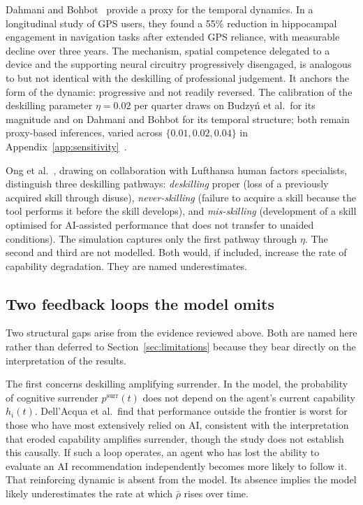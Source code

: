 \documentclass[11pt,a4paper]{article}
\begin{document}
Dahmani and Bohbot~\cite{dahmani_scirep_2020} provide a proxy for the
temporal dynamics. In a longitudinal study of GPS users, they found a 55\%
reduction in hippocampal engagement in navigation tasks after extended GPS
reliance, with measurable decline over three years. The mechanism, spatial
competence delegated to a device and the supporting neural circuitry
progressively disengaged, is analogous to but not identical with the
deskilling of professional judgement. It anchors the form of the dynamic:
progressive and not readily reversed. The calibration of the deskilling
parameter $\eta = 0.02$ per quarter draws on Budzy\'{n} et al.\ for its
magnitude and on Dahmani and Bohbot for its temporal structure; both remain
proxy-based inferences, varied across $\{0.01, 0.02, 0.04\}$ in
Appendix~\ref{app:sensitivity}~\cite{gerlich_societies_2025}.

Ong et al.~\cite{ong_npjdm_2026,casner_humafact_2014}, drawing on collaboration with Lufthansa
human factors specialists, distinguish three deskilling pathways:
\textit{deskilling} proper (loss of a previously acquired skill through
disuse), \textit{never-skilling} (failure to acquire a skill because the
tool performs it before the skill develops), and \textit{mis-skilling}
(development of a skill optimised for AI-assisted performance that does not
transfer to unaided conditions). The simulation captures only the first
pathway through $\eta$. The second and third are not modelled. Both would, if
included, increase the rate of capability degradation. They are named
underestimates.

\subsection{Two feedback loops the model omits}

Two structural gaps arise from the evidence reviewed above. Both are named
here rather than deferred to Section~\ref{sec:limitations} because they bear
directly on the interpretation of the results.

The first concerns deskilling amplifying surrender. In the model, the
probability of cognitive surrender $p^{\text{surr}}(t)$ does not depend on
the agent's current capability $h_i(t)$. Dell'Acqua et al.\ find that
performance outside the frontier is worst for those who have most
extensively relied on AI, consistent with the interpretation that eroded
capability amplifies surrender, though the study does not establish this
causally. If such a loop operates, an agent who has lost the ability to
evaluate an AI recommendation independently becomes more likely to follow
it. That reinforcing dynamic is absent from the model. Its absence implies
the model likely underestimates the rate at which $\bar{\rho}$ rises over
time.
\end{document}

